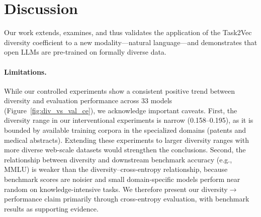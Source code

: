 \section{Discussion}
Our work extends, examines, and thus validates the application of the Task2Vec diversity coefficient to a new modality---natural language---and demonstrates that open LLMs are pre-trained on formally diverse data.

\paragraph{Limitations.}
While our controlled experiments show a consistent positive trend between diversity and evaluation performance across 33 models (Figure~\ref{fig:div_vs_val_ce}), we acknowledge important caveats.
First, the diversity range in our interventional experiments is narrow (0.158--0.195), as it is bounded by available training corpora in the specialized domains (patents and medical abstracts).
Extending these experiments to larger diversity ranges with more diverse web-scale datasets would strengthen the conclusions.
Second, the relationship between diversity and downstream benchmark accuracy (e.g., MMLU) is weaker than the diversity--cross-entropy relationship, because benchmark scores are noisier and small domain-specific models perform near random on knowledge-intensive tasks.
We therefore present our diversity$\to$performance claim primarily through cross-entropy evaluation, with benchmark results as supporting evidence.

